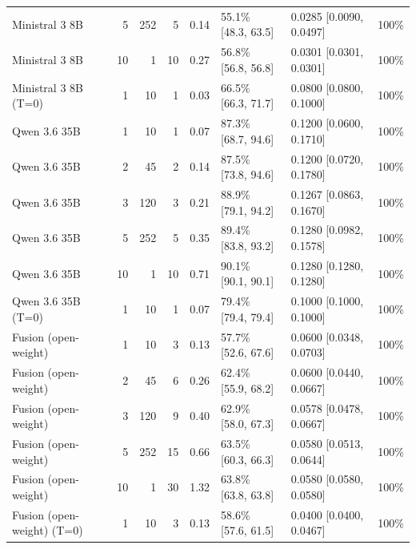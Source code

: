 \begin{table}[htbp]
{\begin{tabular}{lrrrrllr}
  Ministral 3 8B & 5 & 252 & 5 & 0.14 & 55.1\% \tiny[48.3, 63.5] & 0.0285 \tiny[0.0090, 0.0497] & 100\% \\
  Ministral 3 8B & 10 & 1 & 10 & 0.27 & 56.8\% \tiny[56.8, 56.8] & 0.0301 \tiny[0.0301, 0.0301] & 100\% \\
  Ministral 3 8B (T=0) & 1 & 10 & 1 & 0.03 & 66.5\% \tiny[66.3, 71.7] & 0.0800 \tiny[0.0800, 0.1000] & 100\% \\
\midrule
  Qwen 3.6 35B & 1 & 10 & 1 & 0.07 & 87.3\% \tiny[68.7, 94.6] & 0.1200 \tiny[0.0600, 0.1710] & 100\% \\
  Qwen 3.6 35B & 2 & 45 & 2 & 0.14 & 87.5\% \tiny[73.8, 94.6] & 0.1200 \tiny[0.0720, 0.1780] & 100\% \\
  Qwen 3.6 35B & 3 & 120 & 3 & 0.21 & 88.9\% \tiny[79.1, 94.2] & 0.1267 \tiny[0.0863, 0.1670] & 100\% \\
  Qwen 3.6 35B & 5 & 252 & 5 & 0.35 & 89.4\% \tiny[83.8, 93.2] & 0.1280 \tiny[0.0982, 0.1578] & 100\% \\
  Qwen 3.6 35B & 10 & 1 & 10 & 0.71 & 90.1\% \tiny[90.1, 90.1] & 0.1280 \tiny[0.1280, 0.1280] & 100\% \\
  Qwen 3.6 35B (T=0) & 1 & 10 & 1 & 0.07 & 79.4\% \tiny[79.4, 79.4] & 0.1000 \tiny[0.1000, 0.1000] & 100\% \\
\midrule
  Fusion (open-weight) & 1 & 10 & 3 & 0.13 & 57.7\% \tiny[52.6, 67.6] & 0.0600 \tiny[0.0348, 0.0703] & 100\% \\
  Fusion (open-weight) & 2 & 45 & 6 & 0.26 & 62.4\% \tiny[55.9, 68.2] & 0.0600 \tiny[0.0440, 0.0667] & 100\% \\
  Fusion (open-weight) & 3 & 120 & 9 & 0.40 & 62.9\% \tiny[58.0, 67.3] & 0.0578 \tiny[0.0478, 0.0667] & 100\% \\
  Fusion (open-weight) & 5 & 252 & 15 & 0.66 & 63.5\% \tiny[60.3, 66.3] & 0.0580 \tiny[0.0513, 0.0644] & 100\% \\
  Fusion (open-weight) & 10 & 1 & 30 & 1.32 & 63.8\% \tiny[63.8, 63.8] & 0.0580 \tiny[0.0580, 0.0580] & 100\% \\
  Fusion (open-weight) (T=0) & 1 & 10 & 3 & 0.13 & 58.6\% \tiny[57.6, 61.5] & 0.0400 \tiny[0.0400, 0.0467] & 100\% \\
\bottomrule
\end{tabular}%
}
\end{table}
